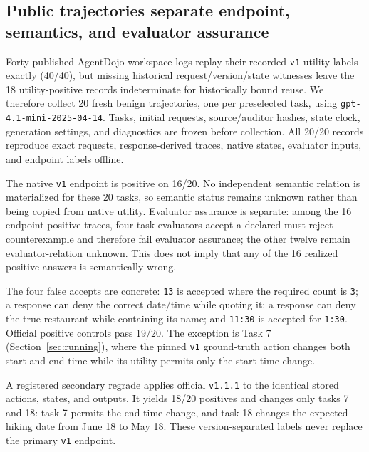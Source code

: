 \subsection{Public trajectories separate endpoint, semantics, and evaluator assurance}
Forty published AgentDojo workspace logs replay their recorded \texttt{v1} utility labels exactly (40/40), but missing historical request/version/state witnesses leave the 18 utility-positive records indeterminate for historically bound reuse. We therefore collect 20 fresh benign trajectories, one per preselected task, using \texttt{gpt-4.1-mini-2025-04-14}. Tasks, initial requests, source/auditor hashes, state clock, generation settings, and diagnostics are frozen before collection. All 20/20 records reproduce exact requests, response-derived traces, native states, evaluator inputs, and endpoint labels offline.

The native \texttt{v1} endpoint is positive on 16/20. No independent semantic relation is materialized for these 20 tasks, so semantic status remains unknown rather than being copied from native utility. Evaluator assurance is separate: among the 16 endpoint-positive traces, four task evaluators accept a declared must-reject counterexample and therefore fail evaluator assurance; the other twelve remain evaluator-relation unknown. This does not imply that any of the 16 realized positive answers is semantically wrong.

The four false accepts are concrete: \texttt{13} is accepted where the required count is \texttt{3}; a response can deny the correct date/time while quoting it; a response can deny the true restaurant while containing its name; and \texttt{11:30} is accepted for \texttt{1:30}. Official positive controls pass 19/20. The exception is Task 7 (Section~\ref{sec:running}), where the pinned \texttt{v1} ground-truth action changes both start and end time while its utility permits only the start-time change.

A registered secondary regrade applies official \texttt{v1.1.1} to the identical stored actions, states, and outputs. It yields 18/20 positives and changes only tasks 7 and 18: task 7 permits the end-time change, and task 18 changes the expected hiking date from June 18 to May 18. These version-separated labels never replace the primary \texttt{v1} endpoint.

